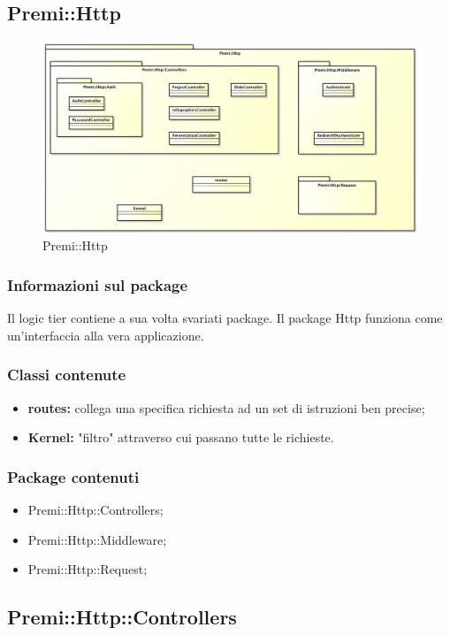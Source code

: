 \newpage
\subsection{Premi::Http}
		\begin{figure}[h]
			\centering
			\includegraphics[width=0.9\linewidth]{img/premi_http}
			\caption[Premi::Http]{Premi::Http}
			\label{fig:premi_http}
		\end{figure}

	\subsubsection*{Informazioni sul package}
	 Il logic tier contiene a sua volta svariati package. Il package Http funziona come un'interfaccia alla vera applicazione.
	 \subsubsection*{Classi contenute}
	 \begin{itemize}
	 	\item \textbf{routes: }collega una specifica richiesta ad un set di istruzioni ben precise;
	 	\item \textbf{Kernel: }"filtro" attraverso cui passano tutte le richieste.
	 \end{itemize}
	 \subsubsection*{Package contenuti}
		 \begin{itemize}
		 	\item Premi::Http::Controllers;
		 	\item Premi::Http::Middleware;
		 	\item Premi::Http::Request;
		 \end{itemize}

\newpage
\subsection{Premi::Http::Controllers}
